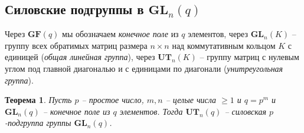 \documentclass{article}
\newtheorem{theorem}{Теорема}[section]
\begin{document}
\subsection{Силовские подгруппы в $\textbf{GL}_n(q)$}

Через $\textbf{GF}(q)$ мы обозначаем \textit{конечное поле} из $q$ элементов, через $\textbf{GL}_n(K)$ -- группу всех обратимых матриц размера $n \times n$ над коммутативным кольцом $K$ с единицей (\textit{общая линейная группа}), через $\textbf{UT}_n(K)$ -- группу матриц с нулевым углом под главной диагональю и с единицами по диагонали (\textit{унитреугольная группа}).

\begin{theorem}
    Пусть $p$ -- простое число, $m, n$ -- целые числа $\geqslant 1$ и $q = p^m$ и $\textbf{GL}_n(q)$ -- конечное поле из $q$ элементов. Тогда $\textbf{UT}_n(q)$ -- силовская $p$-подгруппа группы $\textbf{GL}_n(q)$.
\end{theorem}
\end{document}
